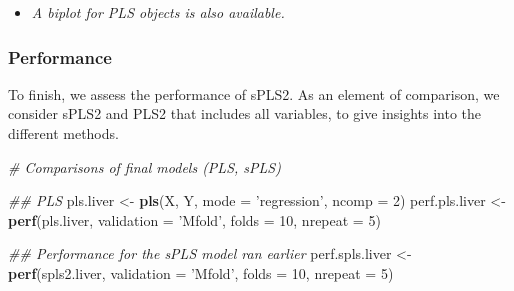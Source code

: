 \documentclass[]{book}
\newenvironment{Shaded}{\begin{snugshade}}{\end{snugshade}}
\newcommand{\CommentTok}[1]{\textcolor[rgb]{0.56,0.35,0.01}{\textit{#1}}}
\newcommand{\DataTypeTok}[1]{\textcolor[rgb]{0.13,0.29,0.53}{#1}}
\newcommand{\DecValTok}[1]{\textcolor[rgb]{0.00,0.00,0.81}{#1}}
\newcommand{\KeywordTok}[1]{\textcolor[rgb]{0.13,0.29,0.53}{\textbf{#1}}}
\newcommand{\NormalTok}[1]{#1}
\newcommand{\StringTok}[1]{\textcolor[rgb]{0.31,0.60,0.02}{#1}}
\providecommand{\tightlist}{%
  \setlength{\itemsep}{0pt}\setlength{\parskip}{0pt}}
\begin{document}
\begin{itemize}
\tightlist
\item
  \emph{A biplot for PLS objects is also available.}
\end{itemize}

\hypertarget{performance}{%
\subsubsection{Performance}\label{performance}}

To finish, we assess the performance of sPLS2. As an element of comparison, we consider sPLS2 and PLS2 that includes all variables, to give insights into the different methods.

\begin{Shaded}
\begin{Highlighting}[]
\CommentTok{# Comparisons of final models (PLS, sPLS)}

\CommentTok{## PLS}
\NormalTok{pls.liver <-}\StringTok{ }\KeywordTok{pls}\NormalTok{(X, Y, }\DataTypeTok{mode =} \StringTok{'regression'}\NormalTok{, }\DataTypeTok{ncomp =} \DecValTok{2}\NormalTok{)}
\NormalTok{perf.pls.liver <-}\StringTok{  }\KeywordTok{perf}\NormalTok{(pls.liver, }\DataTypeTok{validation =} \StringTok{'Mfold'}\NormalTok{, }\DataTypeTok{folds =} \DecValTok{10}\NormalTok{, }
                        \DataTypeTok{nrepeat =} \DecValTok{5}\NormalTok{)}

\CommentTok{## Performance for the sPLS model ran earlier}
\NormalTok{perf.spls.liver <-}\StringTok{  }\KeywordTok{perf}\NormalTok{(spls2.liver, }\DataTypeTok{validation =} \StringTok{'Mfold'}\NormalTok{, }\DataTypeTok{folds =} \DecValTok{10}\NormalTok{, }
                         \DataTypeTok{nrepeat =} \DecValTok{5}\NormalTok{)}
\end{Highlighting}
\end{Shaded}
\end{document}
